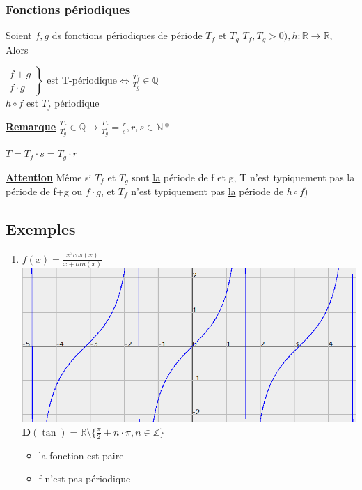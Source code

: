 \documentclass[12pt,a4paper]{article}
\newcommand{\evid}[1]{\textbf{\underline{#1}}}
\newcommand{\R}{\ensuremath{\mathbb{R}} }
\newcommand{\N}{\ensuremath{\mathbb{N}} }
\newcommand{\Z}{\ensuremath{\mathbb{Z}} }
\newcommand{\Q}{\ensuremath{\mathbb{Q}} }
\newcommand{\rtor}{\ensuremath{\R \to \R} }
\begin{document}
{\subsubsection{Fonctions périodiques}
Soient $f,g$ ds fonctions périodiques de période $T_f$ et $T_g$ $T_f,T_g > 0), h : \rtor$, Alors 
\begin{boite}
	$\left.
	\begin{array}{l}
	f+g\\
	f\cdot g
	\end{array}
	\right\}$ est T-périodique$ \iff \frac{T_f}{T_g} \in \Q$\\
	$h\circ f$ est $T_f$ périodique
\end{boite} 
\evid{Remarque} $\frac{T_f}{T_g} \in \Q \to \frac{T_f}{T_g} = \frac{r}{s}, r,s \in \N*$\\
\begin{boite}[0.3]
	$T = T_f \cdot s = T_g \cdot r$
\end{boite}
\evid{Attention} Même si $T_f$ et $T_g$ sont \underline{la} période de f et g, T n'est typiquement pas la période de f+g ou $f\cdot g$, et $T_f$ n'est typiquement pas \underline{la} période de $h\circ f)$
\subsection{Exemples}
\begin{enumerate}
\item $f(x) = \frac{x^3cos(x)}{x+tan(x)}$ \\
	\includegraphics[scale=0.3]{illustrations_Analyse/tanx}\\
	$\mathbf{D}(\tan) = \R\setminus \{\frac{\pi}{2} + n\cdot \pi, n \in \Z\}$
	\begin{itemize}
		\item la fonction est paire
		\item f n'est pas périodique
	\end{itemize}
	

\end{enumerate}}
\end{document}
